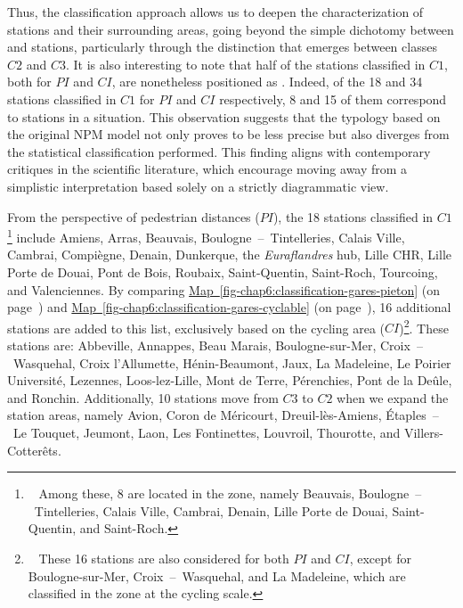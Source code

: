 \begin{refsegment}
Thus, the classification approach allows us to deepen the characterization of stations and their surrounding areas, going beyond the simple dichotomy between  and  stations, particularly through the distinction that emerges between classes \(C2\) and \(C3\). It is also interesting to note that half of the stations classified in \(C1\), both for \(PI\) and \(CI\), are nonetheless positioned as . Indeed, of the 18 and 34 stations classified in \(C1\) for \(PI\) and \(CI\) respectively, 8 and 15 of them correspond to stations in a  situation. This observation suggests that the typology based on the original \acrshort{NPM} model not only proves to be less precise but also diverges from the statistical classification performed. This finding aligns with contemporary critiques in the scientific literature, which encourage moving away from a simplistic interpretation based solely on a strictly diagrammatic view.%

From the perspective of pedestrian distances (\(PI\)), the 18 stations classified in \(C1\)\footnote{~
    Among these, 8 are located in the  zone, namely Beauvais, Boulogne~–~Tintelleries, Calais Ville, Cambrai, Denain, Lille Porte de Douai, Saint-Quentin, and Saint-Roch.
} include Amiens, Arras, Beauvais, Boulogne~–~Tintelleries, Calais Ville, Cambrai, Compiègne, Denain, Dunkerque, the \textsl{Euraflandres} hub, Lille CHR, Lille Porte de Douai, Pont de Bois, Roubaix, Saint-Quentin, Saint-Roch, Tourcoing, and Valenciennes. By comparing \hyperref[fig-chap6:classification-gares-pieton]{Map~\ref{fig-chap6:classification-gares-pieton}} (on page~\pageref{fig-chap6:classification-gares-pieton}) and \hyperref[fig-chap6:classification-gares-cyclable]{Map~\ref{fig-chap6:classification-gares-cyclable}} (on page~\pageref{fig-chap6:classification-gares-cyclable}), 16 additional stations are added to this list, exclusively based on the cycling area (\(CI\))\footnote{~
    These 16 stations are also considered  for both \(PI\) and \(CI\), except for Boulogne-sur-Mer, Croix~–~Wasquehal, and La Madeleine, which are classified in the  zone at the cycling scale.
}. These stations are: Abbeville, Annappes, Beau Marais, Boulogne-sur-Mer, Croix~–~Wasquehal, Croix l'Allumette, Hénin-Beaumont, Jaux, La Madeleine, Le Poirier Université, Lezennes, Loos-lez-Lille, Mont de Terre, Pérenchies, Pont de la Deûle, and Ronchin. Additionally, 10 stations move from \(C3\) to \(C2\) when we expand the station areas, namely Avion, Coron de Méricourt, Dreuil-lès-Amiens, Étaples~–~Le Touquet, Jeumont, Laon, Les Fontinettes, Louvroil, Thourotte, and Villers-Cotterêts.%


\end{refsegment}
